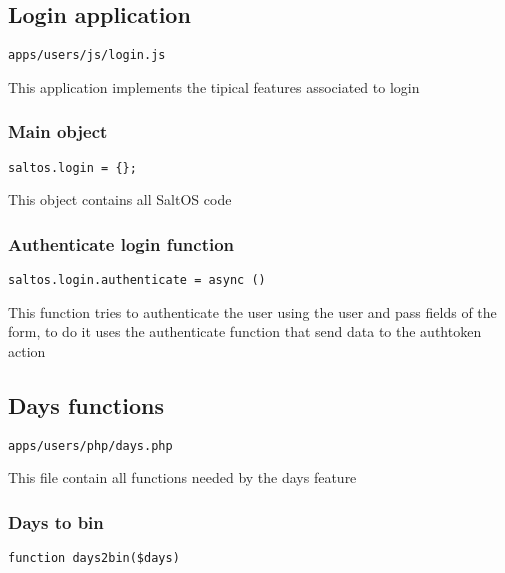 \documentclass[a4paper]{article}
\begin{document}
\hypertarget{toc176}{}
\subsection{Login application}

\begin{lstlisting}
apps/users/js/login.js
\end{lstlisting}

This application implements the tipical features associated to login

\hypertarget{toc177}{}
\subsubsection{Main object}

\begin{lstlisting}
saltos.login = {};
\end{lstlisting}

This object contains all SaltOS code

\hypertarget{toc178}{}
\subsubsection{Authenticate login function}

\begin{lstlisting}
saltos.login.authenticate = async ()
\end{lstlisting}

This function tries to authenticate the user using the user and pass fields of the form, to do
it uses the authenticate function that send data to the authtoken action

\hypertarget{toc179}{}
\subsection{Days functions}

\begin{lstlisting}
apps/users/php/days.php
\end{lstlisting}

This file contain all functions needed by the days feature

\hypertarget{toc180}{}
\subsubsection{Days to bin}

\begin{lstlisting}
function days2bin($days)
\end{lstlisting}
\end{document}
